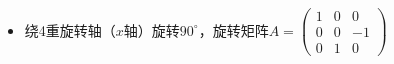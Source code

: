 \begin{itemize}[itemsep=0pt,parsep=0pt]
\begin{itemize}[itemsep=0pt,parsep=0pt]
\begin{align*}
\begin{array}{ccc}
                    -\varepsilon_{32} & \varepsilon_{31} & \varepsilon_{33} \\
                \end{array}
                \right)
                \equiv 
                \left(
                \begin{array}{ccc}
                    \varepsilon_{11} & \varepsilon_{12} & \varepsilon_{13} \\
                    \varepsilon_{21} & \varepsilon_{22} & \varepsilon_{23} \\
                    \varepsilon_{31} & \varepsilon_{32} & \varepsilon_{33} \\
                \end{array}
                \right)
                =\boldsymbol{\varepsilon}
            \end{align*}
            化简可得
            \[
            \boldsymbol{\varepsilon}=
            \left(
            \begin{array}{ccc}
                \varepsilon_{0} & 0 & 0 \\
                0 & \varepsilon_{0} & 0 \\
                0 & 0 & \varepsilon_{33} \\
            \end{array}
            \right)
            \]
            \item
            绕4重旋转轴（$x$轴）旋转$90^{\circ}$，旋转矩阵$ 
            A=
            \left(
            \begin{array}{ccc}
                1 & 0 & 0 \\
                0 & 0 & -1\\
                0 & 1 & 0
            \end{array}
            \right)
            $


\end{itemize}
\end{itemize}
